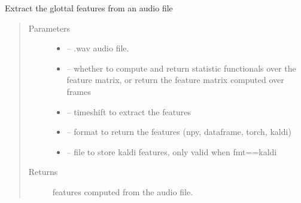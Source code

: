 \documentclass[letterpaper,10pt,english]{sphinxmanual}
\begin{document}
\begin{fulllineitems}
\begin{fulllineitems}
\label{\detokenize{Glottal:glottal.Glottal.extract_features_file}}
Extract the glottal features from an audio file
\begin{quote}\begin{description}
\item[{Parameters}] \leavevmode\begin{itemize}
\item {} 
 -- .wav audio file.

\item {} 
 -- whether to compute and return statistic functionals over the feature matrix, or return the feature matrix computed over frames

\item {} 
 -- timeshift to extract the features

\item {} 
 -- format to return the features (npy, dataframe, torch, kaldi)

\item {} 
 -- file to store kaldi features, only valid when fmt==\sphinxquotedblright{}kaldi\sphinxquotedblright{}

\end{itemize}

\item[{Returns}] \leavevmode
features computed from the audio file.

\end{description}\end{quote}


\end{fulllineitems}
\end{fulllineitems}
\end{document}
